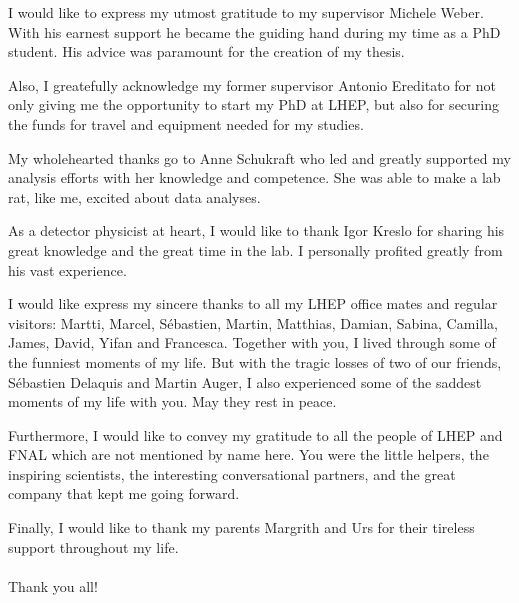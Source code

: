 I would like to express my utmost gratitude to my supervisor Michele Weber. With his earnest support he became the guiding hand during my time as a PhD student. His advice was paramount for the creation of my thesis.

Also, I greatefully acknowledge my former supervisor Antonio Ereditato for not only giving me the opportunity to start my PhD at LHEP, but also for securing the funds for travel and equipment needed for my studies.

My wholehearted thanks go to Anne Schukraft who led and greatly supported my analysis efforts with her knowledge and competence. She was able to make a lab rat, like me, excited about data analyses.

As a detector physicist at heart, I would like to thank Igor Kreslo for sharing his great knowledge and the great time in the lab. I personally profited greatly from his vast experience.

I would like express my sincere thanks to all my LHEP office mates and regular visitors: Martti, Marcel, S\'ebastien, Martin, Matthias, Damian, Sabina, Camilla, James, David, Yifan and Francesca. Together with you, I lived through some of the funniest moments of my life. But with the tragic losses of two of our friends, S\'ebastien Delaquis and Martin Auger, I also experienced some of the saddest moments of my life with you. May they rest in peace.

Furthermore, I would like to convey my gratitude to all the people of LHEP and FNAL which are not mentioned by name here. You were the little helpers, the inspiring scientists, the interesting conversational partners, and the great company that kept me going forward.

Finally, I would like to thank my parents Margrith and Urs for their tireless support throughout my life.
\\
\\
Thank you all!


